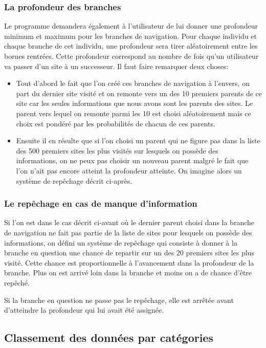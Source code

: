 \documentclass[a4paper, 11pt]{article}
\begin{document}
\subsubsection{La profondeur des branches}

Le programme demandera également à l'utilisateur de lui donner une profondeur minimum et maximum pour les branches de navigation. Pour chaque individu et chaque branche de cet individu, une profondeur sera tirer aléatoirement entre les bornes rentrées. Cette profondeur correspond au nombre de fois qu'un utilisateur va passer d'un site à un successeur. Il faut faire remarquer deux choses: 
\begin{itemize}
\item Tout d'abord le fait que l'on créé ces branches de navigation à l'envers, on part du dernier site visité et on remonte vers un des 10 premiers parents de ce site car les seules informations que nous avons sont les parents des sites. Le parent vers lequel on remonte parmi les 10 est choisi aléatoirement mais ce choix est pondéré par les probabilités de chacun de ces parents.
\item Ensuite il en résulte que si l'on choisi un parent qui ne figure pas dans la liste des 500 premiers sites les plus visités sur lesquels on possède des informations, on ne peux pas choisir un nouveau parent malgré le fait que l'on n'ait pas encore atteint la profondeur atteinte. On imagine alors un système de repêchage décrit ci-après.
\end{itemize}

\subsubsection{Le repêchage en cas de manque d'information}

Si l'on est dans le cas décrit ci-avant où le dernier parent choisi dans la branche de navigation ne fait pas partie de la liste de sites pour lesquels on possède des informations, on défini un système de repêchage qui consiste à donner à la branche en question une chance de repartir sur un des 20 premiers sites les plus visité. Cette chance est proportionnelle à l'avancement dans la profondeur de la branche. Plus on est arrivé loin dans la branche et moins on a de chance d'être repêché.

Si la branche en question ne passe pas le repêchage, elle est arrêtée avant d'atteindre la profondeur qui lui avait été assignée.

\subsection{Classement des données par catégories}
\end{document}

